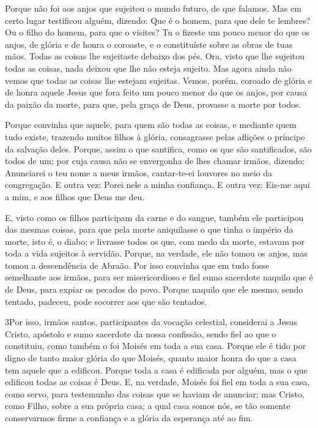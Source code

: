 Porque não foi aos anjos que sujeitou o mundo futuro, de que
falamos. Mas em certo lugar testificou alguém, dizendo: Que é o
homem, para que dele te lembres? Ou o filho do homem, para que o
visites? Tu o fizeste um pouco menor do que os anjos, de glória
e de honra o coroaste, e o constituíste sobre as obras de tuas mãos.
Todas as coisas lhe sujeitaste debaixo dos pés. Ora, visto que
lhe sujeitou todas as coisas, nada deixou que lhe não esteja
sujeito. Mas agora ainda não vemos que todas as coisas lhe estejam
sujeitas. Vemos, porém, coroado de glória e de honra aquele
Jesus que fora feito um pouco menor do que os anjos, por causa da
paixão da morte, para que, pela graça de Deus, provasse a morte por
todos.

Porque convinha que aquele, para quem são todas as coisas, e
mediante quem tudo existe, trazendo muitos filhos à glória,
consagrasse pelas aflições o príncipe da salvação deles.
Porque, assim o que santifica, como os que são santificados,
são todos de um; por cuja causa não se envergonha de lhes chamar
irmãos, dizendo: Anunciarei o teu nome a meus irmãos,
cantar-te-ei louvores no meio da congregação. E outra vez:
Porei nele a minha confiança. E outra vez: Eis-me aqui a mim, e aos
filhos que Deus me deu.

E, visto como os filhos participam da carne e do sangue, também
ele participou das mesmas coisas, para que pela morte aniquilasse o
que tinha o império da morte, isto é, o diabo; e livrasse
todos os que, com medo da morte, estavam por toda a vida sujeitos à
servidão. Porque, na verdade, ele não tomou os anjos, mas
tomou a descendência de Abraão. Por isso convinha que em tudo
fosse semelhante aos irmãos, para ser misericordioso e fiel sumo
sacerdote naquilo que é de Deus, para expiar os pecados do povo.
Porque naquilo que ele mesmo, sendo tentado, padeceu, pode
socorrer aos que são tentados.

\medskip

\lettrine{3} Por isso, irmãos santos, participantes da vocação
celestial, considerai a Jesus Cristo, apóstolo e sumo sacerdote da
nossa confissão, sendo fiel ao que o constituiu, como também o
foi Moisés em toda a sua casa. Porque ele é tido por digno de
tanto maior glória do que Moisés, quanto maior honra do que a casa
tem aquele que a edificou. Porque toda a casa é edificada por
alguém, mas o que edificou todas as coisas é Deus. E, na
verdade, Moisés foi fiel em toda a sua casa, como servo, para
testemunho das coisas que se haviam de anunciar; mas Cristo,
como Filho, sobre a sua própria casa; a qual casa somos nós, se tão
somente conservarmos firme a confiança e a glória da esperança até
ao fim.

